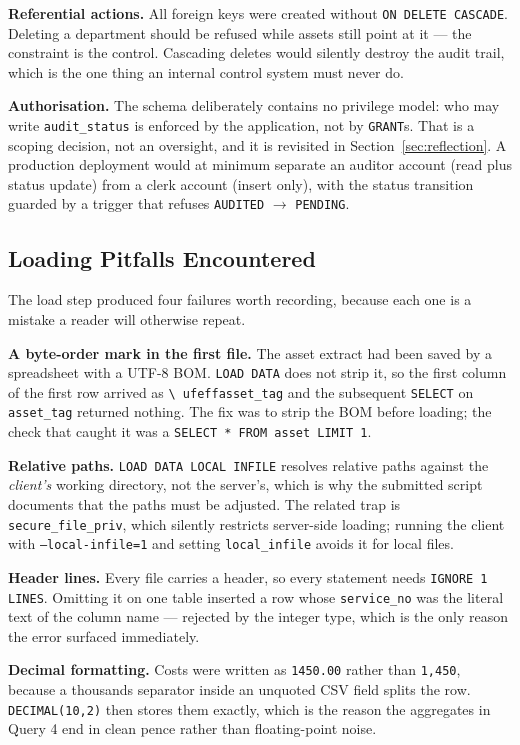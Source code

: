 \documentclass[conference]{IEEEtran}
\begin{document}
\textbf{Referential actions.} All foreign keys were created without
\texttt{ON DELETE CASCADE}. Deleting a department should be refused while
assets still point at it --- the constraint is the control. Cascading deletes
would silently destroy the audit trail, which is the one thing an internal
control system must never do.

\textbf{Authorisation.} The schema deliberately contains no privilege model:
who may write \texttt{audit\_status} is enforced by the application, not by
\texttt{GRANT}s. That is a scoping decision, not an oversight, and it is
revisited in Section~\ref{sec:reflection}. A production deployment would at
minimum separate an auditor account (read plus status update) from a clerk
account (insert only), with the status transition guarded by a trigger that
refuses \texttt{AUDITED} $\rightarrow$ \texttt{PENDING}.

\subsection{Loading Pitfalls Encountered}
The load step produced four failures worth recording, because each one is a
mistake a reader will otherwise repeat.

\textbf{A byte-order mark in the first file.} The asset extract had been
saved by a spreadsheet with a UTF-8 BOM. \texttt{LOAD DATA} does not strip it,
so the first column of the first row arrived as \texttt{\textbackslash
ufeffasset\_tag} and the subsequent \texttt{SELECT} on \texttt{asset\_tag}
returned nothing. The fix was to strip the BOM before loading; the check that
caught it was a \texttt{SELECT * FROM asset LIMIT 1}.

\textbf{Relative paths.} \texttt{LOAD DATA LOCAL INFILE} resolves relative
paths against the \emph{client's} working directory, not the server's, which
is why the submitted script documents that the paths must be adjusted. The
related trap is \texttt{secure\_file\_priv}, which silently restricts
server-side loading; running the client with \texttt{--local-infile=1} and
setting \texttt{local\_infile} avoids it for local files.

\textbf{Header lines.} Every file carries a header, so every statement needs
\texttt{IGNORE 1 LINES}. Omitting it on one table inserted a row whose
\texttt{service\_no} was the literal text of the column name --- rejected by
the integer type, which is the only reason the error surfaced immediately.

\textbf{Decimal formatting.} Costs were written as \texttt{1450.00} rather
than \texttt{1,450}, because a thousands separator inside an unquoted CSV
field splits the row. \texttt{DECIMAL(10,2)} then stores them exactly, which
is the reason the aggregates in Query 4 end in clean pence rather than
floating-point noise.
\end{document}
